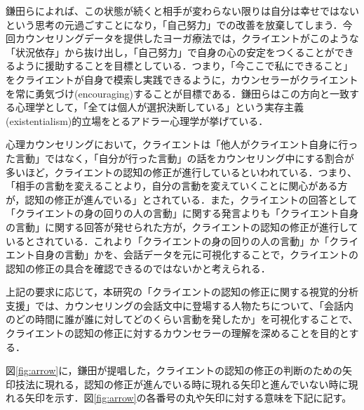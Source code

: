 \documentclass[shuuron]{kuee}
\begin{document}
鎌田ら\cite{Darshana}によれば、この状態が続くと相手が変わらない限りは自分は幸せではないという思考の元過ごすことになり，「自己努力」での改善を放棄してしまう．今回カウンセリングデータを提供したヨーガ療法では，クライエントがこのような「状況依存」から抜け出し，「自己努力」で自身の心の安定をつくることができるように援助することを目標としている．つまり，「今ここで私にできること」をクライエントが自身で模索し実践できるように，カウンセラーがクライエントを常に勇気づけ(encouraging)することが目標である．鎌田らはこの方向と一致する心理学として，「全ては個人が選択決断している」という実存主義(existentialism)的立場をとるアドラー心理学が挙げている．

心理カウンセリングにおいて，クライエントは「他人がクライエント自身に行った言動」ではなく，「自分が行った言動」の話をカウンセリング中にする割合が多いほど，クライエントの認知の修正が進行しているといわれている．つまり、「相手の言動を変えることより，自分の言動を変えていくことに関心がある方が，認知の修正が進んでいる」\cite{zokad}とされている．また，クライエントの回答として「クライエントの身の回りの人の言動」に関する発言よりも「クライエント自身の言動」に関する回答が発せられた方が，クライエントの認知の修正が進行しているとされている．これより「クライエントの身の回りの人の言動」か「クライエント自身の言動」かを、会話データを元に可視化することで，クライエントの認知の修正の具合を確認できるのではないかと考えられる．


上記の要求に応じて，本研究の「クライエントの認知の修正に関する視覚的分析支援」では、カウンセリングの会話文中に登場する人物たちについて、「会話内のどの時間に誰が誰に対してどのくらい言動を発したか」を可視化することで、クライエントの認知の修正に対するカウンセラーの理解を深めることを目的とする．

図\ref{fig:arrow}に，鎌田\cite{鎌田穣2002臨床}が提唱した，クライエントの認知の修正の判断のための矢印技法に現れる，認知の修正が進んでいる時に現れる矢印と進んでいない時に現れる矢印を示す．図\ref{fig:arrow}の各番号の丸や矢印に対する意味を下記に記す。
\end{document}

